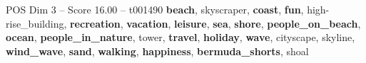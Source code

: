 \begin{textsample}{POS Dim 3 – Score 16.00 – t001490}  \label{ex:f3_pos_022}
\textbf{beach}, skyscraper, \textbf{coast}, \textbf{fun}, high-rise\_building, \textbf{recreation}, \textbf{vacation}, \textbf{leisure}, \textbf{sea}, \textbf{shore}, \textbf{people\_on\_beach}, \textbf{ocean}, \textbf{people\_in\_nature}, tower, \textbf{travel}, \textbf{holiday}, \textbf{wave}, cityscape, skyline, \textbf{wind\_wave}, \textbf{sand}, \textbf{walking}, \textbf{happiness}, \textbf{bermuda\_shorts}, shoal

\end{textsample}
